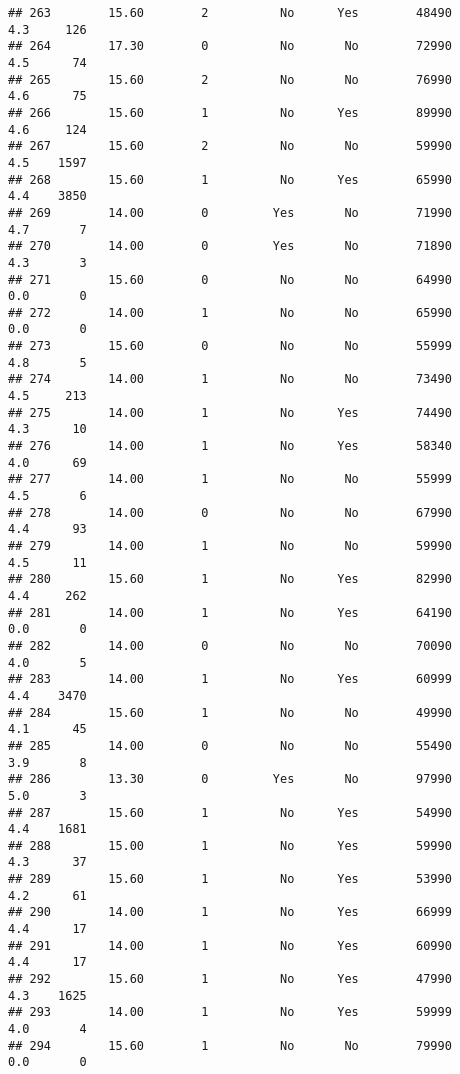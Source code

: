 \documentclass[
]{article}
\begin{document}
\begin{verbatim}
## 263        15.60        2          No      Yes        48490         4.3     126
## 264        17.30        0          No       No        72990         4.5      74
## 265        15.60        2          No       No        76990         4.6      75
## 266        15.60        1          No      Yes        89990         4.6     124
## 267        15.60        2          No       No        59990         4.5    1597
## 268        15.60        1          No      Yes        65990         4.4    3850
## 269        14.00        0         Yes       No        71990         4.7       7
## 270        14.00        0         Yes       No        71890         4.3       3
## 271        15.60        0          No       No        64990         0.0       0
## 272        14.00        1          No       No        65990         0.0       0
## 273        15.60        0          No       No        55999         4.8       5
## 274        14.00        1          No       No        73490         4.5     213
## 275        14.00        1          No      Yes        74490         4.3      10
## 276        14.00        1          No      Yes        58340         4.0      69
## 277        14.00        1          No       No        55999         4.5       6
## 278        14.00        0          No       No        67990         4.4      93
## 279        14.00        1          No       No        59990         4.5      11
## 280        15.60        1          No      Yes        82990         4.4     262
## 281        14.00        1          No      Yes        64190         0.0       0
## 282        14.00        0          No       No        70090         4.0       5
## 283        14.00        1          No      Yes        60999         4.4    3470
## 284        15.60        1          No       No        49990         4.1      45
## 285        14.00        0          No       No        55490         3.9       8
## 286        13.30        0         Yes       No        97990         5.0       3
## 287        15.60        1          No      Yes        54990         4.4    1681
## 288        15.00        1          No      Yes        59990         4.3      37
## 289        15.60        1          No      Yes        53990         4.2      61
## 290        14.00        1          No      Yes        66999         4.4      17
## 291        14.00        1          No      Yes        60990         4.4      17
## 292        15.60        1          No      Yes        47990         4.3    1625
## 293        14.00        1          No      Yes        59999         4.0       4
## 294        15.60        1          No       No        79990         0.0       0

\end{verbatim}
\end{document}
